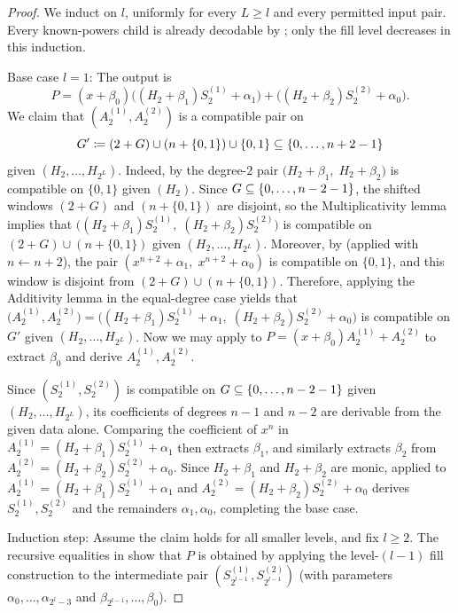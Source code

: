 \begin{proof}
    We induct on $l$, uniformly for every $L\ge l$ and every permitted
    input pair.  Every known-powers child is already decodable by
    ; only the fill level decreases in this induction.

    Base case $l=1$: The output is
    \[
        P=(x+\beta_0)\bigl((H_2+\beta_1)S^{(1)}_2+\alpha_1\bigr)+\bigl((H_2+\beta_2)S^{(2)}_2+\alpha_0\bigr).
    \]
    We claim that $(A^{(1)}_2,A^{(2)}_2)$ is a compatible pair on
    \[
        G' \coloneqq (2+G)\cup(n+\{0,1\})\cup\{0,1\}\subseteq\{0,\dotsc,n+2-1\}
    \]
    given $(H_2,\ldots,H_{2^L})$.
    Indeed, by  the degree-$2$ pair $\bigl(H_2+\beta_1,\;H_2+\beta_2\bigr)$ is compatible on $\{0,1\}$ given $(H_2)$.
    Since $G\subseteq\{0,\dotsc,n-2-1\}$, the shifted windows $(2+G)$ and $(n+\{0,1\})$ are disjoint, so the Multiplicativity lemma implies that $\bigl((H_2+\beta_1)S^{(1)}_2,\;(H_2+\beta_2)S^{(2)}_2\bigr)$ is compatible on $(2+G)\cup(n+\{0,1\})$ given $(H_2,\ldots,H_{2^L})$.
    Moreover, by  (applied with $n\gets n+2$), the pair $(x^{n+2}+\alpha_1,\;x^{n+2}+\alpha_0)$ is compatible on $\{0,1\}$, and this window is disjoint from $(2+G)\cup(n+\{0,1\})$.
    Therefore, applying the Additivity lemma in the equal-degree case yields that $\bigl(A^{(1)}_2,A^{(2)}_2\bigr)=\bigl((H_2+\beta_1)S^{(1)}_2+\alpha_1,\;(H_2+\beta_2)S^{(2)}_2+\alpha_0\bigr)$ is compatible on $G'$ given $(H_2,\ldots,H_{2^L})$.
    Now we may apply  to $P=(x+\beta_0)A^{(1)}_2+A^{(2)}_2$ to extract $\beta_0$ and derive $A^{(1)}_2,A^{(2)}_2$.

    Since $(S^{(1)}_2,S^{(2)}_2)$ is compatible on $G\subseteq\{0,\dotsc,n-2-1\}$ given $(H_2,\ldots,H_{2^L})$, its coefficients of degrees $n-1$ and $n-2$ are derivable from the given data alone.
    Comparing the coefficient of $x^{n}$ in $A^{(1)}_2=(H_2+\beta_1)S^{(1)}_2+\alpha_1$ then extracts $\beta_1$, and similarly extracts $\beta_2$ from $A^{(2)}_2=(H_2+\beta_2)S^{(2)}_2+\alpha_0$.
    Since $H_2+\beta_1$ and $H_2+\beta_2$ are monic,  applied to
    \(
      A^{(1)}_2=(H_2+\beta_1)S^{(1)}_2+\alpha_1
    \)
    and
    \(
      A^{(2)}_2=(H_2+\beta_2)S^{(2)}_2+\alpha_0
    \)
    derives $S^{(1)}_2,S^{(2)}_2$ and the remainders $\alpha_1,\alpha_0$, completing the base case.

    Induction step: Assume the claim holds for all smaller levels, and fix $l\ge 2$.
    The recursive equalities in  show that $P$ is obtained by applying the level-$(l-1)$ fill construction to the intermediate pair $(S^{(1)}_{2^{l-1}},S^{(2)}_{2^{l-1}})$ (with parameters $\alpha_0,\ldots,\alpha_{2^l-3}$ and $\beta_{2^{l-1}},\ldots,\beta_0$).


\end{proof}
